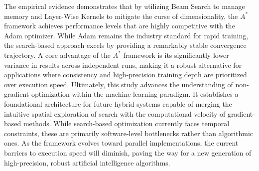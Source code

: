 The empirical evidence demonstrates that by utilizing Beam Search to manage memory and Layer-Wise Kernels to mitigate the curse of dimensionality, the $A^*$ framework achieves performance levels that are highly competitive with the Adam optimizer. While Adam remains the industry standard for rapid training, the search-based approach excels by providing a remarkably stable convergence trajectory. A core advantage of the $A^*$ framework is its significantly lower variance in results across independent runs, making it a robust alternative for applications where consistency and high-precision training depth are prioritized over execution speed.
Ultimately, this study advances the understanding of non-gradient optimization within the machine learning paradigm. It establishes a foundational architecture for future hybrid systems capable of merging the intuitive spatial exploration of search with the computational velocity of gradient-based methods. While search-based optimization currently faces temporal constraints, these are primarily software-level bottlenecks rather than algorithmic ones. As the framework evolves toward parallel implementations, the current barriers to execution speed will diminish, paving the way for a new generation of high-precision, robust artificial intelligence algorithms.